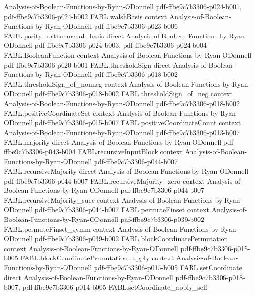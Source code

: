 \begin{theorem}
  {Analysis-of-Boolean-Functions-by-Ryan-ODonnell}
  {pdf-ffbe9c7b3306-p024-b001,
    pdf-ffbe9c7b3306-p024-b002}
\proofstep
  {FABL.walshBasis}
  {context}
  {Analysis-of-Boolean-Functions-by-Ryan-ODonnell}
  {pdf-ffbe9c7b3306-p023-b006}
\proofstep
  {FABL.parity_orthonormal_basis}
  {direct}
  {Analysis-of-Boolean-Functions-by-Ryan-ODonnell}
  {pdf-ffbe9c7b3306-p024-b003,
    pdf-ffbe9c7b3306-p024-b004}
\proofstep
  {FABL.BooleanFunction}
  {context}
  {Analysis-of-Boolean-Functions-by-Ryan-ODonnell}
  {pdf-ffbe9c7b3306-p020-b001}
\proofstep
  {FABL.thresholdSign}
  {direct}
  {Analysis-of-Boolean-Functions-by-Ryan-ODonnell}
  {pdf-ffbe9c7b3306-p018-b002}
\proofstep
  {FABL.thresholdSign_of_nonneg}
  {context}
  {Analysis-of-Boolean-Functions-by-Ryan-ODonnell}
  {pdf-ffbe9c7b3306-p018-b002}
\proofstep
  {FABL.thresholdSign_of_neg}
  {context}
  {Analysis-of-Boolean-Functions-by-Ryan-ODonnell}
  {pdf-ffbe9c7b3306-p018-b002}
\proofstep
  {FABL.positiveCoordinateSet}
  {context}
  {Analysis-of-Boolean-Functions-by-Ryan-ODonnell}
  {pdf-ffbe9c7b3306-p015-b007}
\proofstep
  {FABL.positiveCoordinateCount}
  {context}
  {Analysis-of-Boolean-Functions-by-Ryan-ODonnell}
  {pdf-ffbe9c7b3306-p013-b007}
\proofstep
  {FABL.majority}
  {direct}
  {Analysis-of-Boolean-Functions-by-Ryan-ODonnell}
  {pdf-ffbe9c7b3306-p043-b004}
\proofstep
  {FABL.recursiveInputBlock}
  {context}
  {Analysis-of-Boolean-Functions-by-Ryan-ODonnell}
  {pdf-ffbe9c7b3306-p044-b007}
\proofstep
  {FABL.recursiveMajority}
  {direct}
  {Analysis-of-Boolean-Functions-by-Ryan-ODonnell}
  {pdf-ffbe9c7b3306-p044-b007}
\proofstep
  {FABL.recursiveMajority_zero}
  {context}
  {Analysis-of-Boolean-Functions-by-Ryan-ODonnell}
  {pdf-ffbe9c7b3306-p044-b007}
\proofstep
  {FABL.recursiveMajority_succ}
  {context}
  {Analysis-of-Boolean-Functions-by-Ryan-ODonnell}
  {pdf-ffbe9c7b3306-p044-b007}
\proofstep
  {FABL.permuteFinset}
  {context}
  {Analysis-of-Boolean-Functions-by-Ryan-ODonnell}
  {pdf-ffbe9c7b3306-p039-b002}
\proofstep
  {FABL.permuteFinset_symm}
  {context}
  {Analysis-of-Boolean-Functions-by-Ryan-ODonnell}
  {pdf-ffbe9c7b3306-p039-b002}
\proofstep
  {FABL.blockCoordinatePermutation}
  {context}
  {Analysis-of-Boolean-Functions-by-Ryan-ODonnell}
  {pdf-ffbe9c7b3306-p015-b005}
\proofstep
  {FABL.blockCoordinatePermutation_apply}
  {context}
  {Analysis-of-Boolean-Functions-by-Ryan-ODonnell}
  {pdf-ffbe9c7b3306-p015-b005}
\proofstep
  {FABL.setCoordinate}
  {direct}
  {Analysis-of-Boolean-Functions-by-Ryan-ODonnell}
  {pdf-ffbe9c7b3306-p018-b007,
    pdf-ffbe9c7b3306-p014-b005}
\proofstep
  {FABL.setCoordinate_apply_self}

\end{theorem}
